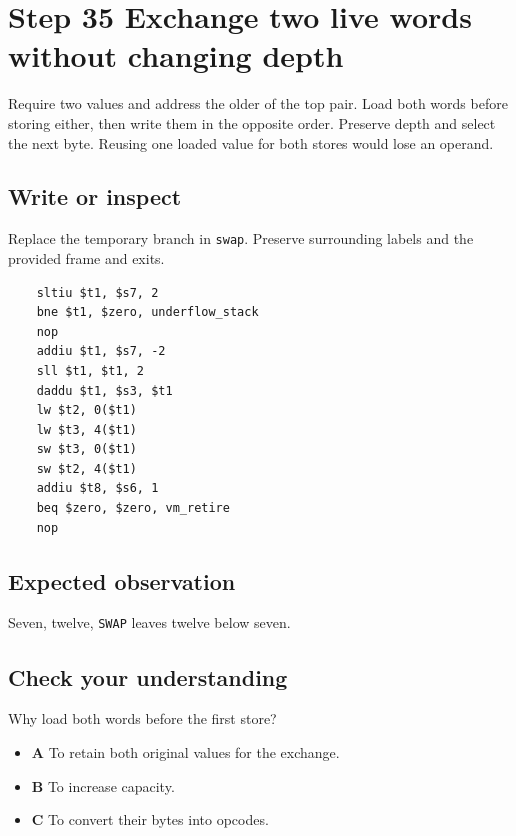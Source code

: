 \section{Step 35 Exchange two live words without changing depth}\label{vm-s35}

Require two values and address the older of the top pair. Load both words before storing either, then write them in the opposite order. Preserve depth and select the next byte. Reusing one loaded value for both stores would lose an operand.

\subsection{Write or inspect}
Replace the temporary branch in \texttt{swap}. Preserve surrounding labels and the provided frame and exits.

\begin{verbatim}
    sltiu $t1, $s7, 2
    bne $t1, $zero, underflow_stack
    nop
    addiu $t1, $s7, -2
    sll $t1, $t1, 2
    daddu $t1, $s3, $t1
    lw $t2, 0($t1)
    lw $t3, 4($t1)
    sw $t3, 0($t1)
    sw $t2, 4($t1)
    addiu $t8, $s6, 1
    beq $zero, $zero, vm_retire
    nop
\end{verbatim}
\subsection{Expected observation}
Seven, twelve, \texttt{SWAP} leaves twelve below seven.

\subsection{Check your understanding}
Why load both words before the first store?

\begin{itemize}
  \item \textbf{A} To retain both original values for the exchange.
  \item \textbf{B} To increase capacity.
  \item \textbf{C} To convert their bytes into opcodes.
\end{itemize}
